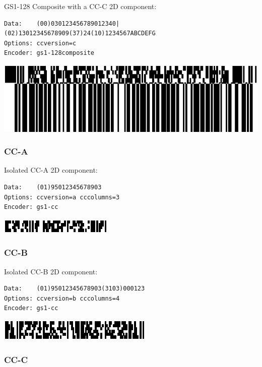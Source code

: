 GS1-128 Composite with a CC-C 2D component:

\begin{verbatim}
Data:    (00)030123456789012340|(02)13012345678909(37)24(10)1234567ABCDEFG
Options: ccversion=c
Encoder: gs1-128composite
\end{verbatim}

\includegraphics{images/ean128composite-2.eps}

\hypertarget{cc-a}{%
\subsubsection{CC-A}\label{cc-a}}

Isolated CC-A 2D component:

\begin{verbatim}
Data:    (01)95012345678903
Options: ccversion=a cccolumns=3
Encoder: gs1-cc
\end{verbatim}

\includegraphics{images/gs1composite-1.eps}

\hypertarget{cc-b}{%
\subsubsection{CC-B}\label{cc-b}}

Isolated CC-B 2D component:

\begin{verbatim}
Data:    (01)95012345678903(3103)000123
Options: ccversion=b cccolumns=4
Encoder: gs1-cc
\end{verbatim}

\includegraphics{images/gs1composite-2.eps}

\hypertarget{cc-c}{%
\subsubsection{CC-C}\label{cc-c}}


